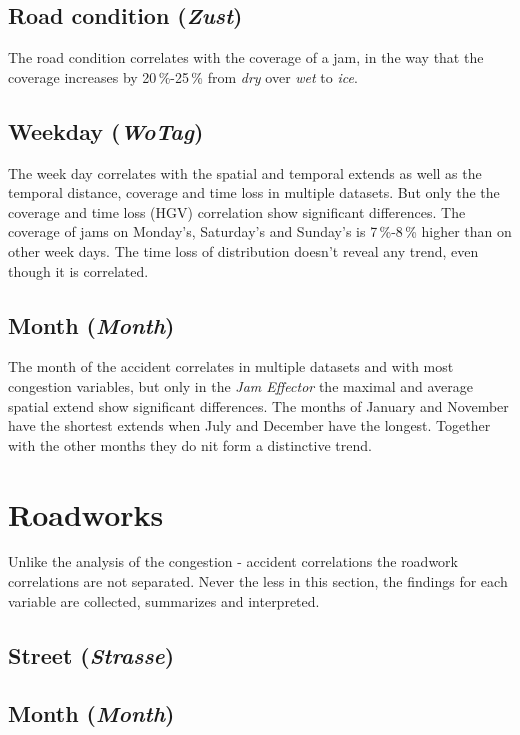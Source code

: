 \subsection{Road condition (\textit{Zust})}
\label{analysis_sum_Zust}
The road condition correlates with the coverage of a jam, in the way that the coverage increases by 20\,\%-25\,\% from \textit{dry} over \textit{wet} to \textit{ice}.

\subsection{Weekday (\textit{WoTag})}
\label{analysis_sum_WoTag}
The week day correlates with the spatial and temporal extends as well as the temporal distance, coverage and time loss in multiple datasets. But only the the coverage and time loss (HGV) correlation show significant differences. The coverage of jams on Monday's, Saturday's and Sunday's is 7\,\%-8\,\% higher than on other week days. The time loss of distribution doesn't reveal any trend, even though it is correlated.

\subsection{Month (\textit{Month})}
\label{analysis_sum_Month}
The month of the accident correlates in multiple datasets and with most congestion variables, but only in the \textit{Jam Effector} the maximal and average spatial extend show significant differences. The months of January and November have the shortest extends when July and December have the longest. Together with the other months they do nit form a distinctive trend. 

\section{Roadworks}

Unlike the analysis of the congestion - accident correlations the roadwork correlations are not separated. Never the less in this section, the findings for each variable are collected, summarizes and interpreted. 

\subsection{Street (\textit{Strasse})}

\subsection{Month (\textit{Month})}


